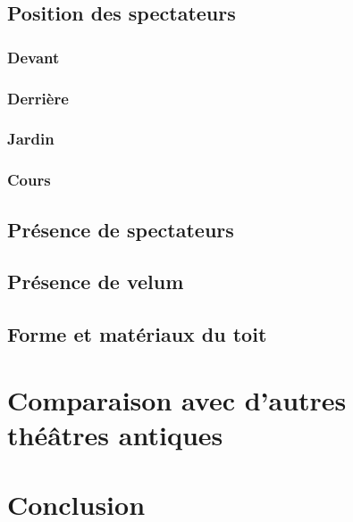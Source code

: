 		\section{Position des spectateurs}
			\subsection{Devant}
			\subsection{Derrière}
			\subsection{Jardin}
			\subsection{Cours}
		\section{Présence de spectateurs}
		\section{Présence de velum}
		\section{Forme et matériaux du toit}
		
		\newpage

	\chapter{Comparaison avec d'autres théâtres antiques}
		\minitoc
		\newpage
	
	\chapter*{Conclusion}
	
		\newpage
		
 
 
